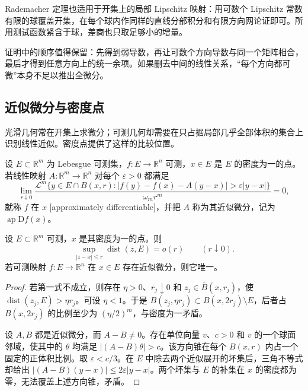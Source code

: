 Rademacher 定理也适用于开集上的局部 Lipschitz 映射：用可数个 Lipschitz 常数有限的球覆盖开集，在每个球内作同样的直线分部积分和有限方向网论证即可。所用测试函数紧含于球，差商也只取足够小的增量。

\ProseParagraphBreak
证明中的顺序值得保留：先得到弱导数，再让可数个方向导数与同一个矩阵相合，最后才得到任意方向上的统一余项。如果删去中间的线性关系，“每个方向都可微”本身不足以推出全微分。

\subsection{近似微分与密度点}
\label{g3:subsec:2002:03}
光滑几何常在开集上求微分；可测几何却需要在只占据局部几乎全部体积的集合上识别线性近似。密度点提供了这样的比较位置。

\begin{definition}\label{g3:def:approximate-differential}
	设 \(E\subset\mathbb R^m\) 为 Lebesgue 可测集，\(f:E\to\mathbb R^n\) 可测，\(x\in E\) 是 \(E\) 的密度为一的点。若线性映射 \(A:\mathbb R^m\to\mathbb R^n\) 对每个 \(\varepsilon>0\) 都满足
	\begin{equation}\label{g3:eq:approximate-differential}
		\lim_{r\downarrow0}
		\frac{\mathcal L^m\{y\in E\cap B(x,r):
		 |f(y)-f(x)-A(y-x)|>\varepsilon|y-x|\}}
		 {\omega_m r^m}=0,
	\end{equation}
	就称 \(f\) 在 \(x\) [approximately differentiable]，并把 \(A\) 称为其近似微分，记为 \(\operatorname{ap}\mathrm Df(x)\)。
\end{definition}

\begin{lemma}\label{g3:lem:density-no-large-holes}
	设 \(E\subset\mathbb R^m\) 可测，\(x\) 是其密度为一的点。则
	\begin{equation}\label{g3:eq:density-no-large-holes}
		\sup_{|z-x|\le r}\operatorname{dist}(z,E)=o(r)
		\qquad(r\downarrow0).
	\end{equation}
	若可测映射 \(f:E\to\mathbb R^n\) 在 \(x\in E\) 存在近似微分，则它唯一。
\end{lemma}
\begin{proof}
	若第一式不成立，则存在 \(\eta>0\)、\(r_j\downarrow0\) 和 \(z_j\in\overline B(x,r_j)\)，使 \(\operatorname{dist}(z_j,E)>\eta r_j\)。可设 \(\eta<1\)。于是 \(B(z_j,\eta r_j)\subset B(x,2r_j)\setminus E\)，后者占 \(B(x,2r_j)\) 的比例至少为 \((\eta/2)^m\)，与密度为一矛盾。

	设 \(A,B\) 都是近似微分，而 \(A-B\ne0\)。存在单位向量 \(v\)、\(c>0\) 和 \(v\) 的一个球面邻域，使其中的 \(\theta\) 均满足 \(|(A-B)\theta|>c\)。该方向锥在每个 \(B(x,r)\) 内占一个固定的正体积比例。取 \(\varepsilon<c/3\)。在 \(E\) 中除去两个近似展开的坏集后，三角不等式却给出 \(|(A-B)(y-x)|\le2\varepsilon|y-x|\)。两个坏集与 \(E\) 的补集在 \(x\) 的密度都为零，无法覆盖上述方向锥，矛盾。
\end{proof}

